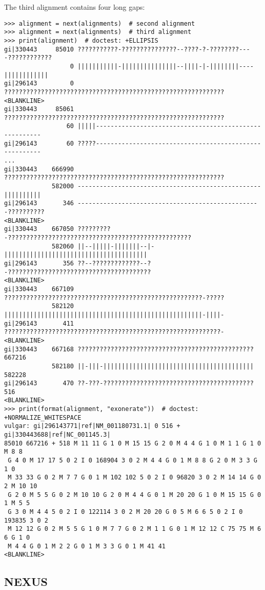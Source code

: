 The third alignment contains four long gaps:
\begin{verbatim}
>>> alignment = next(alignments)  # second alignment
>>> alignment = next(alignments)  # third alignment
>>> print(alignment)  # doctest: +ELLIPSIS
gi|330443     85010 ???????????-???????????????--????-?-????????----????????????
                  0 |||||||||||-|||||||||||||||--||||-|-||||||||----||||||||||||
gi|296143         0 ????????????????????????????????????????????????????????????
<BLANKLINE>
gi|330443     85061 ????????????????????????????????????????????????????????????
                 60 |||||-------------------------------------------------------
gi|296143        60 ?????-------------------------------------------------------
...
gi|330443    666990 ????????????????????????????????????????????????????????????
             582000 --------------------------------------------------||||||||||
gi|296143       346 --------------------------------------------------??????????
<BLANKLINE>
gi|330443    667050 ?????????-??????????????????????????????????????????????????
             582060 ||--|||||-|||||||--|-|||||||||||||||||||||||||||||||||||||||
gi|296143       356 ??--?????????????--?-???????????????????????????????????????
<BLANKLINE>
gi|330443    667109 ??????????????????????????????????????????????????????-?????
             582120 ||||||||||||||||||||||||||||||||||||||||||||||||||||||-||||-
gi|296143       411 ???????????????????????????????????????????????????????????-
<BLANKLINE>
gi|330443    667168 ???????????????????????????????????????????????? 667216
             582180 ||-|||-||||||||||||||||||||||||||||||||||||||||| 582228
gi|296143       470 ??-???-?????????????????????????????????????????    516
<BLANKLINE>
>>> print(format(alignment, "exonerate"))  # doctest: +NORMALIZE_WHITESPACE
vulgar: gi|296143771|ref|NM_001180731.1| 0 516 + gi|330443688|ref|NC_001145.3|
85010 667216 + 518 M 11 11 G 1 0 M 15 15 G 2 0 M 4 4 G 1 0 M 1 1 G 1 0 M 8 8
 G 4 0 M 17 17 5 0 2 I 0 168904 3 0 2 M 4 4 G 0 1 M 8 8 G 2 0 M 3 3 G 1 0
 M 33 33 G 0 2 M 7 7 G 0 1 M 102 102 5 0 2 I 0 96820 3 0 2 M 14 14 G 0 2 M 10 10
 G 2 0 M 5 5 G 0 2 M 10 10 G 2 0 M 4 4 G 0 1 M 20 20 G 1 0 M 15 15 G 0 1 M 5 5
 G 3 0 M 4 4 5 0 2 I 0 122114 3 0 2 M 20 20 G 0 5 M 6 6 5 0 2 I 0 193835 3 0 2
 M 12 12 G 0 2 M 5 5 G 1 0 M 7 7 G 0 2 M 1 1 G 0 1 M 12 12 C 75 75 M 6 6 G 1 0
 M 4 4 G 0 1 M 2 2 G 0 1 M 3 3 G 0 1 M 41 41
<BLANKLINE>
\end{verbatim}


\subsection{NEXUS}
\label{subsec:align_nexus}

